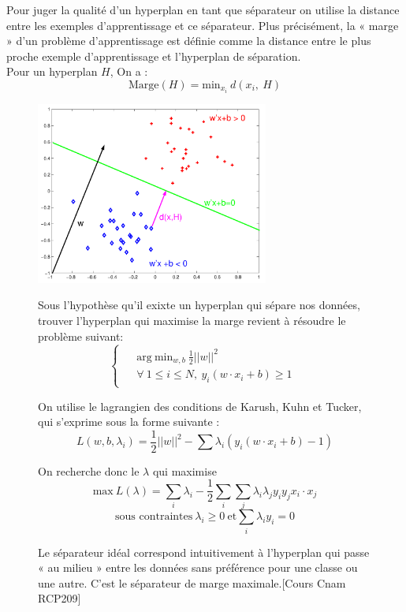 \documentclass[a4paper,12pt,titlepage]{report}
\begin{document}
Pour juger la qualité d’un hyperplan en tant que séparateur on utilise la distance entre les exemples d’apprentissage et ce séparateur. Plus précisément, la « marge » d’un problème d’apprentissage est définie comme la distance entre le plus proche exemple d’apprentissage et l’hyperplan de séparation. \\
Pour un hyperplan $H$, On a :
\[
\text{Marge}(H) = \text{min}_{x_{i}}\ d(x_i,\ H)
\]
\begin{figure}[!h]
	\begin{center}
	\centering	
		\includegraphics[height =6cm, keepaspectratio]{graphes/svm05.png}
		\caption{Le séparateur idéal correspond intuitivement à l’hyperplan qui passe « au milieu » entre les données sans préférence pour une classe ou une autre. C’est le séparateur de marge maximale.[Cours Cnam RCP209]}
	\end{center}

Sous l'hypothèse qu'il exixte un hyperplan qui sépare nos données, trouver l'hyperplan qui maximise la marge revient à résoudre le problème suivant:
\[
	\left\{
	\begin{array}{ccc}		
	\begin{aligned}
		&\text{arg}\ \text{min}_{w,b}\ \frac{1}{2}||w||^{2} \\
		&\forall \ 1 \leqslant i \leqslant N,\ y_i (w \cdot x_i + b)\geqslant 1
	\end{aligned}
\end{array}
	\right.
\]

On utilise le lagrangien des conditions de Karush, Kuhn et Tucker, qui s'exprime sous la forme suivante :
\[
L(w,b,\lambda_{i}) = \frac{1}{2}||w||^{2} - \sum{\lambda_{i}( y_i (w \cdot x_i + b)-1)}
\]

On recherche donc le $\lambda$ qui maximise
\[
\text{max}\ L(\lambda) = \sum_{i}{\lambda_{i}} - \frac{1}{2} \sum_{i}{\sum_{j}{\lambda_{i} \lambda_{j} y_i y_j x_i \cdot x_j}} 
\]
\[
\text{sous contraintes}\ \lambda_i \geqslant 0 \  \text{et} \sum_{i}\lambda_i y_i = 0 
\]
\end{figure}
\end{document}
